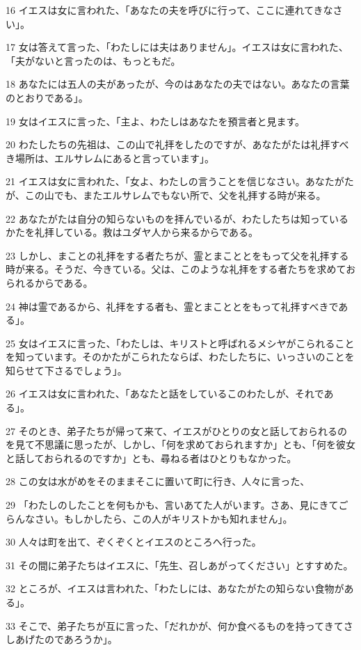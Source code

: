 \par 16 イエスは女に言われた、「あなたの夫を呼びに行って、ここに連れてきなさい」。
\par 17 女は答えて言った、「わたしには夫はありません」。イエスは女に言われた、「夫がないと言ったのは、もっともだ。
\par 18 あなたには五人の夫があったが、今のはあなたの夫ではない。あなたの言葉のとおりである」。
\par 19 女はイエスに言った、「主よ、わたしはあなたを預言者と見ます。
\par 20 わたしたちの先祖は、この山で礼拝をしたのですが、あなたがたは礼拝すべき場所は、エルサレムにあると言っています」。
\par 21 イエスは女に言われた、「女よ、わたしの言うことを信じなさい。あなたがたが、この山でも、またエルサレムでもない所で、父を礼拝する時が来る。
\par 22 あなたがたは自分の知らないものを拝んでいるが、わたしたちは知っているかたを礼拝している。救はユダヤ人から来るからである。
\par 23 しかし、まことの礼拝をする者たちが、霊とまこととをもって父を礼拝する時が来る。そうだ、今きている。父は、このような礼拝をする者たちを求めておられるからである。
\par 24 神は霊であるから、礼拝をする者も、霊とまこととをもって礼拝すべきである」。
\par 25 女はイエスに言った、「わたしは、キリストと呼ばれるメシヤがこられることを知っています。そのかたがこられたならば、わたしたちに、いっさいのことを知らせて下さるでしょう」。
\par 26 イエスは女に言われた、「あなたと話をしているこのわたしが、それである」。
\par 27 そのとき、弟子たちが帰って来て、イエスがひとりの女と話しておられるのを見て不思議に思ったが、しかし、「何を求めておられますか」とも、「何を彼女と話しておられるのですか」とも、尋ねる者はひとりもなかった。
\par 28 この女は水がめをそのままそこに置いて町に行き、人々に言った、
\par 29 「わたしのしたことを何もかも、言いあてた人がいます。さあ、見にきてごらんなさい。もしかしたら、この人がキリストかも知れません」。
\par 30 人々は町を出て、ぞくぞくとイエスのところへ行った。
\par 31 その間に弟子たちはイエスに、「先生、召しあがってください」とすすめた。
\par 32 ところが、イエスは言われた、「わたしには、あなたがたの知らない食物がある」。
\par 33 そこで、弟子たちが互に言った、「だれかが、何か食べるものを持ってきてさしあげたのであろうか」。
